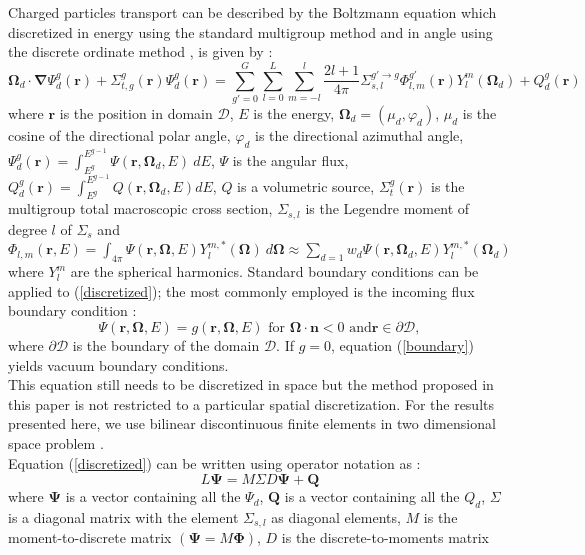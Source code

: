 \documentclass[preprint,10pt]{elsarticle}
\newcommand\bn{\boldsymbol{\nabla}}
\newcommand\bo{\boldsymbol{\Omega}}
\newcommand\br{\mathbf{r}}
\newcommand\bs{\boldsymbol}
\renewcommand{\(}{\left(}
\renewcommand{\)}{\right)}
\renewcommand{\[}{\left[}
\renewcommand{\]}{\right]}
\begin{document}
Charged particles transport can be described by the Boltzmann equation
\cite{graal} which discretized in energy using the standard multigroup method
\cite{reuss} and in angle using the discrete ordinate method \cite{reuss}, is
given by :
\begin{equation}
\bo_d \cdot \bn \Psi_d^g(\br) + \Sigma_{t,g}^g(\br) \Psi_d^g(\br) = \sum_{g'=0}^G
\sum_{l=0}^L\sum_{m=-l}^l \frac{2l+1}{4\pi}\Sigma_{s,l}^{g'\rightarrow
g}\Phi_{l,m}^{g'}(\br)Y_l^m(\bo_d) + Q_d^g(\br)
\label{discretized}
\end{equation}
where $\br$ is the position in domain $\mathcal{D}$, $E$ is the energy,
$\bo_d=(\mu_d,\varphi_d)$, $\mu_d$ is the cosine of the directional polar angle,
$\varphi_d$ is the directional azimuthal angle, 
$\Psi_d^g(\br)=\int_{E^{g}}^{E^{g-1}}\Psi(\br,\bo_d,E)\ dE$, $\Psi$ is
the angular flux, $Q_d^g(\br) = \int_{E^g}^{E^{g-1}}Q(\br,\bo_d,E) dE$, $Q$ is
a volumetric source, $\Sigma_{t}^g(\br)$ is the multigroup total 
macroscopic cross section, $\Sigma_{s,l}$ is the Legendre moment of 
degree $l$ of $\Sigma_s$ and $\Phi_{l,m}(\br,E)= \int_{4\pi}\Psi(\br,\bo,E)Y_l^{m,*}(\bo)\ d\bo
\approx \sum_{d=1} w_d \Psi(\br,\bo_d,E)Y_l^{m,*}(\bo_d)$ where $Y_l^m$ 
are the spherical harmonics.
Standard boundary conditions can be applied to (\ref{discretized}); the most
commonly employed is the incoming flux boundary condition :
\begin{equation}
\Psi(\br,\bo,E) = g(\br,\bo,E)\textrm{ for }\bo\cdot\bs{n}<0\textrm{ and
}\br\in \partial \mathcal{D},
\label{boundary}
\end{equation} 
where $\partial \mathcal{D}$ is the boundary of the domain $\mathcal{D}$. If $g=0$, equation
(\ref{boundary}) yields vacuum boundary conditions.\\
This equation still needs to be discretized in space but the method proposed
in this paper is not restricted to a particular spatial discretization. For
the results presented here, we use bilinear discontinuous finite elements in
two dimensional space problem \cite{dgfem}.\\ 
Equation (\ref{discretized}) can be written using operator notation as :
\begin{equation}
L \bs{\Psi} = M\Sigma D \bs{\Psi} + \bs{Q}
\label{operator}
\end{equation}
where $\bs{\Psi}$ is a vector containing all the $\Psi_d$, $\bs{Q}$ is a
vector containing all the $Q_d$, $\Sigma$ is a diagonal matrix with the
element $\Sigma_{s,l}$ as diagonal elements, $M$ is the moment-to-discrete
matrix $(\bs{\Psi} = M\bs{\Phi})$, $D$ is the discrete-to-moments matrix
\end{document}

